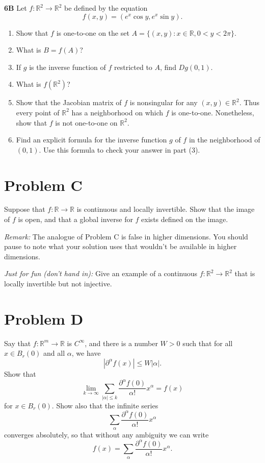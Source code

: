 \documentclass[lang=cn,11pt]{template}
\begin{document}
\noindent \textbf{6B}
Let $f : \mathbb{R}^2 \to \mathbb{R}^2$ be defined by the equation
\[
f(x, y) = (e^x \cos y, e^x \sin y).
\]
\begin{enumerate}
    \item Show that $f$ is one-to-one on the set $A = \{(x, y) : x \in \mathbb{R}, 0 < y < 2\pi\}$.
    \item What is $B = f(A)$?
    \item If $g$ is the inverse function of $f$ restricted to $A$, find $Dg(0, 1)$.
    \item What is $f(\mathbb{R}^2)$?
    \item Show that the Jacobian matrix of $f$ is nonsingular for any $(x, y) \in \mathbb{R}^2$. Thus every point of $\mathbb{R}^2$ has a neighborhood on which $f$ is one-to-one. Nonetheless, show that $f$ is not one-to-one on $\mathbb{R}^2$.
    \item Find an explicit formula for the inverse function $g$ of $f$ in the neighborhood of $(0, 1)$. Use this formula to check your answer in part (3).
\end{enumerate}


\section*{Problem C}
Suppose that $f : \mathbb{R} \to \mathbb{R}$ is continuous and locally invertible. Show that the image of $f$ is open, and that a global inverse for $f$ exists defined on the image.

\textit{Remark:} The analogue of Problem C is false in higher dimensions. You should pause to note what your solution uses that wouldn’t be available in higher dimensions.

\textit{Just for fun (don’t hand in):} Give an example of a continuous $f : \mathbb{R}^2 \to \mathbb{R}^2$ that is locally invertible but not injective.

\section*{Problem D}
Say that $f : \mathbb{R}^m \to \mathbb{R}$ is $C^\infty$, and there is a number $W > 0$ such that for all $x \in B_r(0)$ and all $\alpha$, we have
\[
|\partial^\alpha f(x)| \leq W |\alpha|.
\]
Show that
\[
\lim_{k \to \infty} \sum_{|\alpha| \leq k} \frac{\partial^\alpha f(0)}{\alpha!} x^\alpha = f(x)
\]
for $x \in B_r(0)$. Show also that the infinite series
\[
\sum_{\alpha} \frac{\partial^\alpha f(0)}{\alpha!} x^\alpha
\]
converges absolutely, so that without any ambiguity we can write
\[
f(x) = \sum_{\alpha} \frac{\partial^\alpha f(0)}{\alpha!} x^\alpha.
\]
\end{document}
